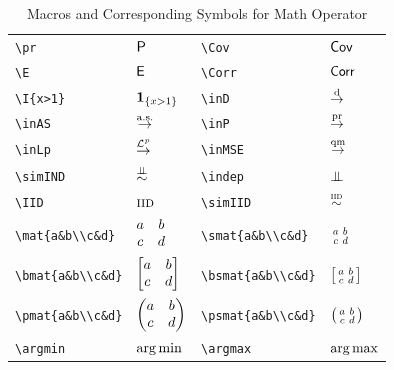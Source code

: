 \documentclass[11pt,a4paper]{article}
\begin{document}
\begin{table}[h]
\begin{tabular}{|>{\centering\arraybackslash}m{3cm}|>{\centering\arraybackslash}m{3cm}||>{\centering\arraybackslash}m{3cm}|>{\centering\arraybackslash}m{3cm}|}
\texttt{\textbackslash pr}  & $ \mathsf{P} $   & \texttt{\textbackslash Cov}    & ${\mathsf{Cov}}$ \\
\texttt{\textbackslash E}   & $\mathsf{E}$   & \texttt{\textbackslash Corr}   & ${\mathsf{Corr}}$ \\
\texttt{\textbackslash I\{x>1\}} & $\mathbf{1}_{\{x>1\}}$ & \texttt{\textbackslash inD} & $\overset{ \textnormal{d} }{\rightarrow}$ \\
\texttt{\textbackslash inAS}   & $\overset{ \textnormal{a.s.} }{\rightarrow}$ & \texttt{\textbackslash inP} & $\overset{ \textnormal{pr} }{\rightarrow}$ \\
\texttt{\textbackslash inLp}   & $\overset{ \mathcal{L}^p }{\rightarrow}$ & \texttt{\textbackslash inMSE} & $\overset{ \textnormal{qm} }{\rightarrow}$ \\
\verb|\simIND|&$\simIND$ & \verb|\indep|& $\indep$\\
\verb|\IID|& $\textsc{iid}$ & \verb|\simIID| &$\overset{ \textsc{iid} }{\sim}$\\
\verb|\mat{a&b\\c&d}|& $\begin{matrix} a&b\\c&d \end{matrix}$ &\verb|\smat{a&b\\c&d}|  &$\begin{smallmatrix} a&b\\c&d \end{smallmatrix}$\\
\verb|\bmat{a&b\\c&d}|& $\begin{bmatrix} a&b\\c&d \end{bmatrix}$& \verb|\bsmat{a&b\\c&d}| & $\begin{bsmallmatrix} a&b\\c&d \end{bsmallmatrix}$\\
\verb|\pmat{a&b\\c&d}| & $\begin{pmatrix} a&b\\c&d \end{pmatrix}$& \verb|\psmat{a&b\\c&d}| &$\begin{psmallmatrix} a&b\\c&d \end{psmallmatrix}$\\
\verb|\argmin| & $\operatorname*{arg\,min}$ &\verb|\argmax| & $\operatorname*{arg\,max}$ \\
\hline
\end{tabular}
\caption{Macros and Corresponding Symbols for Math Operator}
\label{table1}
\end{table}
\end{document}
